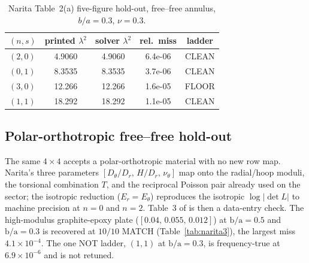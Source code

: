 \documentclass[11pt]{article}
\newcommand{\lamsq}{\lambda^{2}}
\newcommand{\ba}{\mbox{b/a}}
\begin{document}
\begin{table}[htbp]\centering\small
\caption{Narita Table~2(a) \cite{narita1984} five-figure hold-out,
free--free annulus, $b/a=0.3$, $\nu=0.3$.}
\label{tab:narita2a}
\begin{tabular}{lcccc}
\toprule
$(n,s)$ & printed $\lamsq$ & solver $\lamsq$ & rel.\ miss & ladder\\
\midrule
$(2,0)$ & 4.9060 & 4.9060 & 6.4e-06 & CLEAN \\
$(0,1)$ & 8.3535 & 8.3535 & 3.7e-06 & CLEAN \\
$(3,0)$ & 12.266 & 12.266 & 1.6e-05 & FLOOR \\
$(1,1)$ & 18.292 & 18.292 & 1.1e-05 & CLEAN \\
\bottomrule
\end{tabular}
\end{table}

\subsection{Polar-orthotropic free--free hold-out}\label{sec:narita3}
The same $4\times4$ accepts a polar-orthotropic material with no new
row map. Narita's three parameters $[D_\theta/D_r,\,H/D_r,\,\nu_\theta]$
map onto the radial/hoop moduli, the torsional combination $T$, and the
reciprocal Poisson pair already used on the sector; the isotropic
reduction ($E_r=E_\theta$) reproduces the isotropic $\log|\det L|$ to
machine precision at $n=0$ and $n=2$. Table~3 of \cite{narita1984} is
then a data-entry check. The high-modulus graphite-epoxy plate
($[0.04,\,0.055,\,0.012]$) at $\ba=0.5$ and $\ba=0.3$ is recovered at
$10/10$ MATCH (Table~\ref{tab:narita3}), the largest miss
$4.1\times10^{-4}$. The one NOT ladder, $(1,1)$ at $\ba=0.3$, is
frequency-true at $6.9\times10^{-6}$ and is not retuned.
\end{document}
